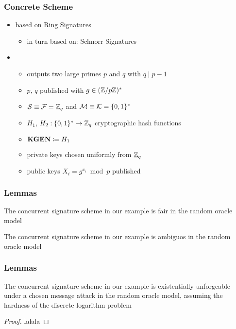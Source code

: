 \begin{frame}
	\frametitle{Concrete Scheme}

	\begin{itemize}[<+->]
		\item based on Ring Signatures
			\begin{itemize}
				\item in turn based on: Schnorr Signatures
			\end{itemize}
		\item \setup 
		\begin{itemize}
			\item outputs two large primes $p$ and $q$ with $q \mid p-1$
			\item $p$, $q$ published with $g\in(\mathbb{Z}/p\mathbb{Z})^\ast$
			\item $\mathcal{S} \equiv \mathcal{F} = \mathbb{Z}_q$ and $\mathcal{M} \equiv \mathcal{K} = \{0,1\}^\ast$
			\item $H_1$, $H_2: \{0,1\}^\ast \to \mathbb{Z}_q$ cryptographic hash functions 
			\item $\textbf{KGEN} \coloneqq H_1$
			\item private keys chosen uniformly from $\mathbb{Z}_q$
			\item public keys $X_i = g^{x_i} \bmod p$ published
		\end{itemize}
	\end{itemize}
\end{frame}

\begin{frame}
	\frametitle{Lemmas}

	\begin{lemma}[Fairness]
		The concurrent signature scheme in our example is fair in the random oracle model
	\end{lemma}

	\begin{lemma}[Ambiguity]
		The concurrent signature scheme in our example is ambiguos in the random oracle model
	\end{lemma}	
\end{frame}

\begin{frame}
	\frametitle{Lemmas}

	\begin{lemma}[Unforgeability]
		The concurrent signature scheme in our example is existentially unforgeable under a chosen message attack in the random oracle model, assuming the hardness of the discrete logarithm problem
	\end{lemma}	
	\begin{proof}
		lalala
	\end{proof}
\end{frame}